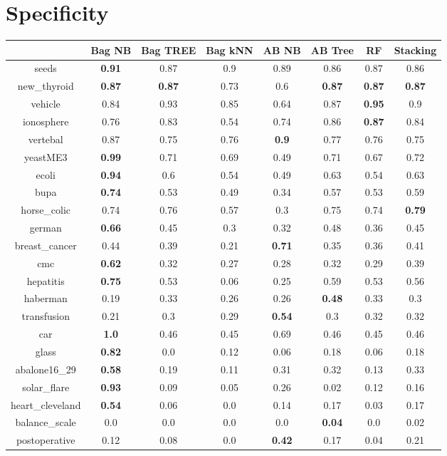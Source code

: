 \documentclass{article}%
\begin{document}
%
\section*{Specificity}%
\begin{tabular}{c|ccccccc}%
&Bag NB&Bag TREE&Bag kNN&AB NB&AB Tree&RF&Stacking\\%
\hline%
seeds&\textbf{0.91}&0.87&0.9&0.89&0.86&0.87&0.86\\%
new\_thyroid&\textbf{0.87}&\textbf{0.87}&0.73&0.6&\textbf{0.87}&\textbf{0.87}&\textbf{0.87}\\%
vehicle&0.84&0.93&0.85&0.64&0.87&\textbf{0.95}&0.9\\%
ionosphere&0.76&0.83&0.54&0.74&0.86&\textbf{0.87}&0.84\\%
vertebal&0.87&0.75&0.76&\textbf{0.9}&0.77&0.76&0.75\\%
yeastME3&\textbf{0.99}&0.71&0.69&0.49&0.71&0.67&0.72\\%
ecoli&\textbf{0.94}&0.6&0.54&0.49&0.63&0.54&0.63\\%
bupa&\textbf{0.74}&0.53&0.49&0.34&0.57&0.53&0.59\\%
horse\_colic&0.74&0.76&0.57&0.3&0.75&0.74&\textbf{0.79}\\%
german&\textbf{0.66}&0.45&0.3&0.32&0.48&0.36&0.45\\%
breast\_cancer&0.44&0.39&0.21&\textbf{0.71}&0.35&0.36&0.41\\%
cmc&\textbf{0.62}&0.32&0.27&0.28&0.32&0.29&0.39\\%
hepatitis&\textbf{0.75}&0.53&0.06&0.25&0.59&0.53&0.56\\%
haberman&0.19&0.33&0.26&0.26&\textbf{0.48}&0.33&0.3\\%
transfusion&0.21&0.3&0.29&\textbf{0.54}&0.3&0.32&0.32\\%
car&\textbf{1.0}&0.46&0.45&0.69&0.46&0.45&0.46\\%
glass&\textbf{0.82}&0.0&0.12&0.06&0.18&0.06&0.18\\%
abalone16\_29&\textbf{0.58}&0.19&0.11&0.31&0.32&0.13&0.33\\%
solar\_flare&\textbf{0.93}&0.09&0.05&0.26&0.02&0.12&0.16\\%
heart\_cleveland&\textbf{0.54}&0.06&0.0&0.14&0.17&0.03&0.17\\%
balance\_scale&0.0&0.0&0.0&0.0&\textbf{0.04}&0.0&0.02\\%
postoperative&0.12&0.08&0.0&\textbf{0.42}&0.17&0.04&0.21\\%
\end{tabular}
\end{document}
